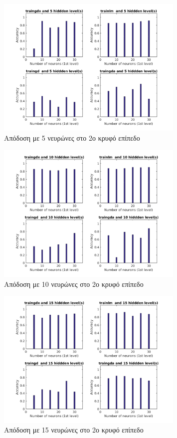 \documentclass[12pt]{article}
\begin{document}
		\begin{figure}[H]
	 		\centering
			\includegraphics[width=0.8\textwidth]{fakelos/NNlvls-5.png}
			\caption{Απόδοση με 5 νευρώνες στο 2ο κρυφό επίπεδο} 	  
			\label{fig:2.NN-lvls5}
		\end{figure}
		
		\begin{figure}[H]
	 		\centering
			\includegraphics[width=0.8\textwidth]{fakelos/NNlvls-10.png}
			\caption{Απόδοση με 10 νευρώνες στο 2ο κρυφό επίπεδο} 	  
			\label{fig:2.NN-lvls10}
		\end{figure}

		\begin{figure}[H]
	 		\centering
			\includegraphics[width=0.8\textwidth]{fakelos/NNlvls-15.png}
			\caption{Απόδοση με 15 νευρώνες στο 2ο κρυφό επίπεδο} 	  
			\label{fig:2.NN-lvls15}
		\end{figure}
\end{document}
